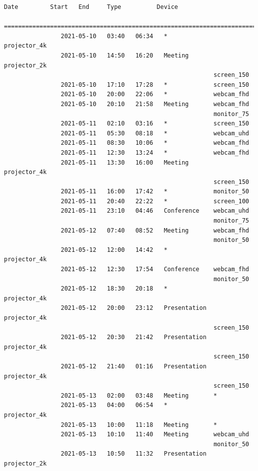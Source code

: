 \documentclass{article}
\begin{document}
\begin{Verbatim}[gobble=8]
                Date         Start   End     Type          Device
                ===========================================================================
                2021-05-10   03:40   06:34   *             projector_4k
                2021-05-10   14:50   16:20   Meeting       projector_2k
                                                           screen_150
                2021-05-10   17:10   17:28   *             screen_150
                2021-05-10   20:00   22:06   *             webcam_fhd
                2021-05-10   20:10   21:58   Meeting       webcam_fhd
                                                           monitor_75
                2021-05-11   02:10   03:16   *             screen_150
                2021-05-11   05:30   08:18   *             webcam_uhd
                2021-05-11   08:30   10:06   *             webcam_fhd
                2021-05-11   12:30   13:24   *             webcam_fhd
                2021-05-11   13:30   16:00   Meeting       projector_4k
                                                           screen_150
                2021-05-11   16:00   17:42   *             monitor_50
                2021-05-11   20:40   22:22   *             screen_100
                2021-05-11   23:10   04:46   Conference    webcam_uhd
                                                           monitor_75
                2021-05-12   07:40   08:52   Meeting       webcam_fhd
                                                           monitor_50
                2021-05-12   12:00   14:42   *             projector_4k
                2021-05-12   12:30   17:54   Conference    webcam_fhd
                                                           monitor_50
                2021-05-12   18:30   20:18   *             projector_4k
                2021-05-12   20:00   23:12   Presentation  projector_4k
                                                           screen_150
                2021-05-12   20:30   21:42   Presentation  projector_4k
                                                           screen_150
                2021-05-12   21:40   01:16   Presentation  projector_4k
                                                           screen_150
                2021-05-13   02:00   03:48   Meeting       *
                2021-05-13   04:00   06:54   *             projector_4k
                2021-05-13   10:00   11:18   Meeting       *
                2021-05-13   10:10   11:40   Meeting       webcam_uhd
                                                           monitor_50
                2021-05-13   10:50   11:32   Presentation  projector_2k

\end{Verbatim}
\end{document}
